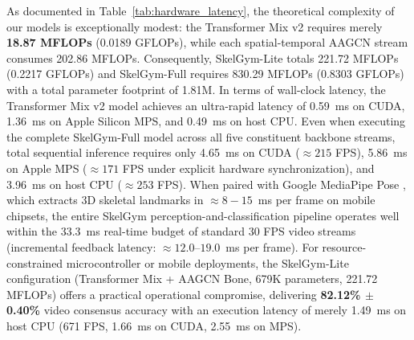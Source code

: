 \documentclass[preprint,12pt]{elsarticle}
\begin{document}
As documented in Table~\ref{tab:hardware_latency}, the theoretical complexity of our models is exceptionally modest: the Transformer Mix v2 requires merely \textbf{18.87 MFLOPs} (0.0189 GFLOPs), while each spatial-temporal AAGCN stream consumes 202.86 MFLOPs. Consequently, SkelGym-Lite totals 221.72 MFLOPs (0.2217 GFLOPs) and SkelGym-Full requires 830.29 MFLOPs (0.8303 GFLOPs) with a total parameter footprint of 1.81M.
In terms of wall-clock latency, the Transformer Mix v2 model achieves an ultra-rapid latency of 0.59~ms on CUDA, 1.36~ms on Apple Silicon MPS, and 0.49~ms on host CPU. Even when executing the complete SkelGym-Full model across all five constituent backbone streams, total sequential inference requires only 4.65~ms on CUDA ($\approx 215$ FPS), 5.86~ms on Apple MPS ($\approx 171$ FPS under explicit hardware synchronization), and 3.96~ms on host CPU ($\approx 253$ FPS). When paired with Google MediaPipe Pose \cite{chuankun2019,bazarevsky2020}, which extracts 3D skeletal landmarks in $\approx 8-15$~ms per frame on mobile chipsets, the entire SkelGym perception-and-classification pipeline operates well within the 33.3~ms real-time budget of standard 30 FPS video streams (incremental feedback latency: $\approx 12.0\text{--}19.0$~ms per frame). For resource-constrained microcontroller or mobile deployments, the SkelGym-Lite configuration (Transformer Mix + AAGCN Bone, 679K parameters, 221.72 MFLOPs) offers a practical operational compromise, delivering \textbf{82.12\% $\pm$ 0.40\%} video consensus accuracy with an execution latency of merely 1.49~ms on host CPU (671 FPS, 1.66~ms on CUDA, 2.55~ms on MPS).
\end{document}
